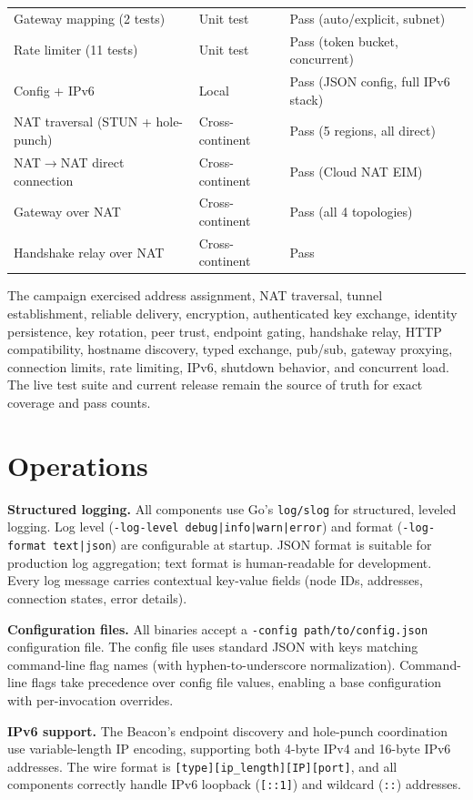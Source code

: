 \documentclass[11pt,a4paper]{article}
\begin{document}
\begin{longtable}{@{}p{}p{}p{}@{}}
Gateway mapping (2 tests) & Unit test & Pass (auto/explicit, subnet) \\
Rate limiter (11 tests) & Unit test & Pass (token bucket, concurrent) \\
Config + IPv6 & Local & Pass (JSON config, full IPv6 stack) \\
\midrule
NAT traversal (STUN + hole-punch) & Cross-continent & Pass (5 regions, all direct) \\
NAT$\rightarrow$NAT direct connection & Cross-continent & Pass (Cloud NAT EIM) \\
Gateway over NAT & Cross-continent & Pass (all 4 topologies) \\
Handshake relay over NAT & Cross-continent & Pass \\
\end{longtable}
\normalsize

The campaign exercised address assignment, NAT traversal, tunnel establishment, reliable delivery, encryption, authenticated key exchange, identity persistence, key rotation, peer trust, endpoint gating, handshake relay, HTTP compatibility, hostname discovery, typed exchange, pub/sub, gateway proxying, connection limits, rate limiting, IPv6, shutdown behavior, and concurrent load. The live test suite and current release remain the source of truth for exact coverage and pass counts.

\section{Operations}

\textbf{Structured logging.} All components use Go's \texttt{log/slog} for structured, leveled logging. Log level (\texttt{-log-level debug|info|warn|error}) and format (\texttt{-log-format text|json}) are configurable at startup. JSON format is suitable for production log aggregation; text format is human-readable for development. Every log message carries contextual key-value fields (node IDs, addresses, connection states, error details).

\textbf{Configuration files.} All binaries accept a \texttt{-config path/to/config.json} configuration file. The config file uses standard JSON with keys matching command-line flag names (with hyphen-to-underscore normalization). Command-line flags take precedence over config file values, enabling a base configuration with per-invocation overrides.

\textbf{IPv6 support.} The Beacon's endpoint discovery and hole-punch coordination use variable-length IP encoding, supporting both 4-byte IPv4 and 16-byte IPv6 addresses. The wire format is \texttt{[type][ip\_length][IP][port]}, and all components correctly handle IPv6 loopback (\texttt{[::1]}) and wildcard (\texttt{::}) addresses.
\end{document}
